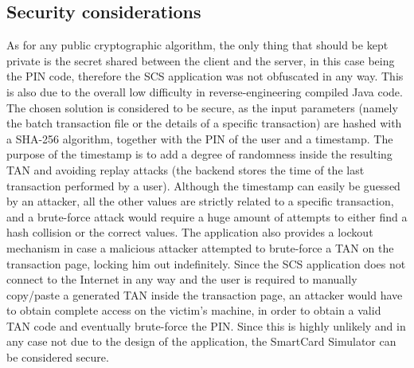 \subsection{Security considerations}
As for any public cryptographic algorithm, the only thing that should be kept private is the secret shared between the client and the server, in this case being the PIN code, therefore the SCS application was not obfuscated in any way. This is also due to the overall low difficulty in reverse-engineering compiled Java code.\newline
The chosen solution is considered to be secure, as the input parameters (namely the batch transaction file or the details of a specific transaction) are hashed with a SHA-256 algorithm, together with the PIN of the user and a timestamp. 
The purpose of the timestamp is to add a degree of randomness inside the resulting TAN and avoiding replay attacks (the backend stores the time of the last transaction performed by a user). Although the timestamp can easily be guessed by an attacker, all the other values are strictly related to a specific transaction, and a brute-force attack would require a huge amount of attempts to either find a hash collision or the correct values. The \gnb{} application also provides a lockout mechanism in case a malicious attacker attempted to brute-force a TAN on the transaction page, locking him out indefinitely.\newline
Since the SCS application does not connect to the Internet in any way and the user is required to manually copy/paste a generated TAN inside the transaction page, an attacker would have to obtain complete access on the victim's machine, in order to obtain a valid TAN code and eventually brute-force the PIN. Since this is highly unlikely and in any case not due to the design of the application, the SmartCard Simulator can be considered secure.